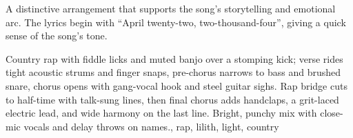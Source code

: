 

\begin{notes}
A distinctive arrangement that supports the song's storytelling and emotional arc. %
The lyrics begin with “April twenty-two, two-thousand-four”, giving a quick sense of the song’s tone.
\end{notes}

\begin{style}
Country rap with fiddle licks and muted banjo over a stomping kick; verse rides tight acoustic strums and finger snaps, pre-chorus narrows to bass and brushed snare, chorus opens with gang-vocal hook and steel guitar sighs. %
Rap bridge cuts to half-time with talk-sung lines, then final chorus adds handclaps, a grit-laced electric lead, and wide harmony on the last line. %
Bright, punchy mix with close-mic vocals and delay throws on names., rap, lilith, light, country
\end{style}

